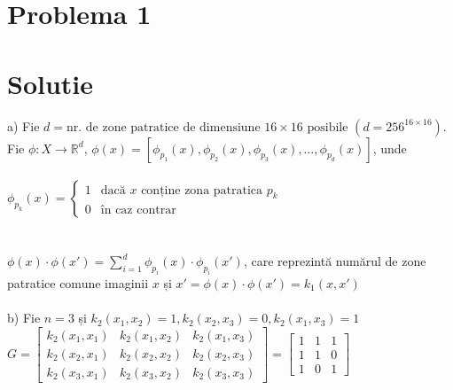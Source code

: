 \documentclass{article}
\begin{document}
\section*{Problema 1}

\section*{Solutie}

a) Fie $d = \text{nr. de zone patratice de dimensiune } 16 \times 16 \text{ posibile}$ $(d = 256^{16 \times 16})$.\\
Fie $\phi: X \rightarrow \mathbb{R}^d$, $\phi(x) = [\phi_{p_1}(x), \phi_{p_2}(x), \phi_{p_3}(x), \dots, \phi_{p_d}(x)]$, unde \\\\ $\phi_{p_k}(x) =
\begin{cases}
1 & \text{dacă } x \text{ conține zona patratica } p_k \\
0 & \text{în caz contrar}
\end{cases}$\\\\\\

\noindent $\phi(x) \cdot \phi(x') = \sum_{i=1}^d \phi_{p_i}(x) \cdot \phi_{p_i}(x')$, care reprezintă numărul de zone patratice comune imaginii $x$ și $x' = \phi(x) \cdot \phi(x') = k_1(x, x')$ \\\\

\noindent b) Fie $n = 3$ și $k_2(x_1, x_2) = 1, k_2(x_2, x_3) = 0 , k_2(x_1, x_3) = 1$ \\

\noindent $G =
\begin{bmatrix}
k_2(x_1, x_1) & k_2(x_1, x_2) & k_2(x_1, x_3) \\
k_2(x_2, x_1) & k_2(x_2, x_2) & k_2(x_2, x_3) \\
k_2(x_3, x_1) & k_2(x_3, x_2) & k_2(x_3, x_3)
\end{bmatrix} =
\begin{bmatrix}
1 & 1 & 1 \\
1 & 1 & 0 \\
1 & 0 & 1
\end{bmatrix}$\\\\
\end{document}
